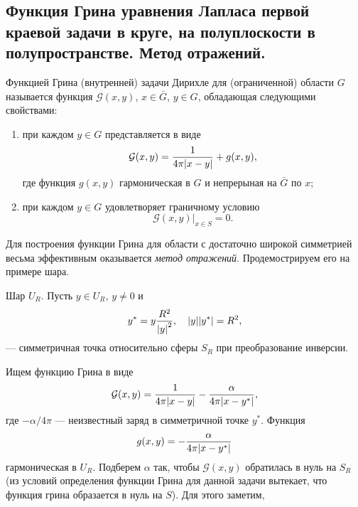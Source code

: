 \subsection{Функция Грина уравнения Лапласа первой краевой задачи в круге, на полуплоскости в полупространстве. Метод отражений.}

Функцией Грина (внутренней) задачи Дирихле для (ограниченной) области $G$ называется функция $\mathcal{G}(x, y)$, $x \in \bar{G}$, $y \in G$, обладающая следующими свойствами:
\begin{enumerate}
	\item при каждом $y \in G$ представляется в виде
	\begin{equation}
		\mathcal{G}(x, y) = \frac{1}{4 \pi \abs{x - y}} + g(x, y),
	\end{equation}
	где функция $g(x, y)$ гармоническая в $G$ и непрерыная на $\bar{G}$ по $x$;
	
	\item при каждом $y \in G$ удовлетворяет граничному условию 
	\begin{equation}
		\mathcal{G}(x, y)|_{x \in S} = 0.
	\end{equation}
\end{enumerate}

Для построения функции Грина для области с достаточно широкой симметрией весьма эффективным оказывается \textit{метод отражений}. Продемострируем его на примере шара. 

	Шар $U_{R}$. Пусть $y \in U_{R}$, $y \not = 0$ и 
	\begin{equation} \label{inverse_transform}
		y^{\ast} = y \frac{R^2}{\abs{y}^2}, \quad \abs{y} \abs{y^{\ast}} = R^2,
	\end{equation}
	--- симметричная точка относительно сферы $S_R$ при преобразование инверсии.
	
	Ищем функцию Грина в виде
	\begin{equation} \label{green}
		\mathcal{G}(x, y) = \frac{1}{4 \pi \abs{x - y}} - \frac{\alpha}{4 \pi \abs{x - y^{\ast}}},
	\end{equation}
	где $- \alpha / 4 \pi$ --- неизвестный заряд в симметричной точке $y^{\ast}$. Функция
	\begin{equation*}
		g(x, y) = - \frac{\alpha}{4 \pi \abs{x - y^{\ast}}}
	\end{equation*}
	гармоническая в $U_{R}$. Подберем $\alpha$ так, чтобы $\mathcal{G}(x, y)$ обратилась в нуль на $S_{R}$ (из условий определения функции Грина для данной задачи вытекает, что функция грина образается в нуль на $S$). Для этого заметим, 

